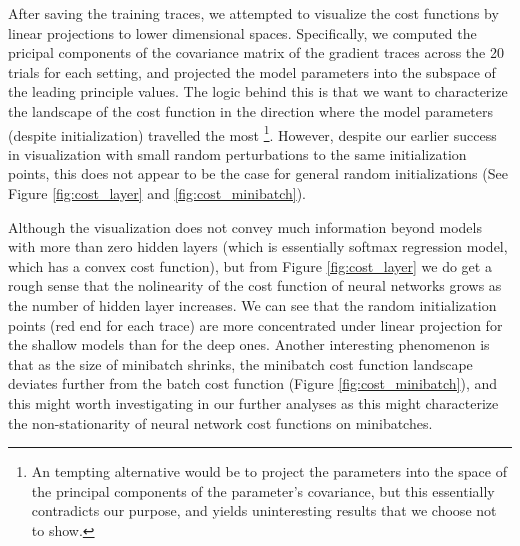 After saving the training traces, we attempted to visualize the cost functions by
linear projections to lower dimensional spaces. Specifically, we computed the pricipal
components of the covariance matrix of the gradient traces across the 20 trials
for each setting, and projected the model parameters into the subspace of the leading
principle values. The logic behind this is that we want to characterize the landscape
of the cost function in the direction where the model parameters (despite initialization)
travelled the most \footnote{An tempting alternative would be to project the parameters
into the space of the principal components of the parameter's covariance, but this 
essentially contradicts our purpose, and yields uninteresting results that we choose not
to show.}. However, despite our earlier success in visualization with small random 
perturbations to the same initialization points, this does not appear to be the case 
for general random initializations (See Figure \ref{fig:cost_layer} and \ref{fig:cost_minibatch}).

Although the visualization does not convey much information beyond models with more
than zero hidden layers (which is essentially softmax regression model, which has a
convex cost function), but from Figure \ref{fig:cost_layer} we do get a rough sense 
that the nolinearity of the cost function of neural networks grows as the number
of hidden layer increases. We can see that the random initialization points (red end
for each trace) are more concentrated under linear projection
for the shallow models than for the deep ones. Another interesting phenomenon is that
as the size of minibatch shrinks, the minibatch cost function landscape deviates further
from the batch cost function (Figure \ref{fig:cost_minibatch}), and this might worth
investigating in our further analyses as this might characterize the non-stationarity
of neural network cost functions on minibatches.